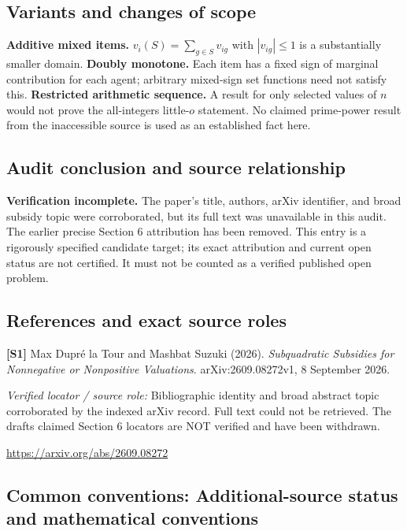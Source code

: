 \documentclass[11pt,a4paper]{article}
\begin{document}
\subsection*{Variants and changes of scope}

\textbf{Additive mixed items.} $v_i(S)=\sum_{g\in S}v_{ig}$ with $|v_{ig}|\leq1$ is a substantially smaller domain. \textbf{Doubly monotone.} Each item has a fixed sign of marginal contribution for each agent; arbitrary mixed-sign set functions need not satisfy this. \textbf{Restricted arithmetic sequence.} A result for only selected values of $n$ would not prove the all-integers little-$o$ statement. No claimed prime-power result from the inaccessible source is used as an established fact here.

\subsection*{Audit conclusion and source relationship}

\textbf{Verification incomplete.} The paper's title, authors, arXiv identifier, and broad subsidy topic were corroborated, but its full text was unavailable in this audit. The earlier precise Section 6 attribution has been removed. This entry is a rigorously specified candidate target; its exact attribution and current open status are not certified. It must not be counted as a verified published open problem.

\subsection*{References and exact source roles}

{\footnotesize\raggedright
\par\noindent\textbf{[S1]} Max Dupr\'e la Tour and Mashbat Suzuki (2026). \emph{Subquadratic Subsidies for Nonnegative or Nonpositive Valuations}. arXiv:2609.08272v1, 8 September 2026.\par \textit{Verified locator / source role:} Bibliographic identity and broad abstract topic corroborated by the indexed arXiv record. Full text could not be retrieved. The draft\textquotesingle s claimed Section 6 locators are NOT verified and have been withdrawn.\par \url{https://arxiv.org/abs/2609.08272}\par\smallskip
}

\subsection*{Common conventions: Additional-source status and mathematical conventions}
\end{document}
